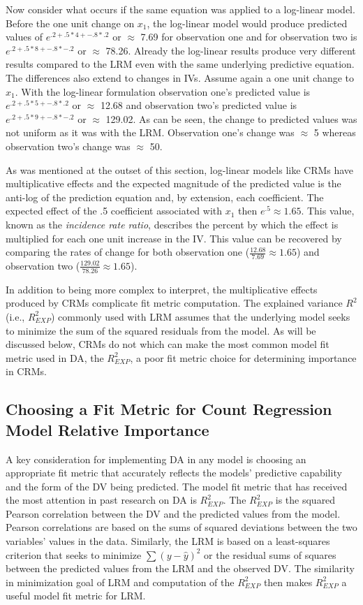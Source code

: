 \documentclass[ShortAfour,times,sageapa]{sagej}
\begin{document}
	Now consider what occurs if the same equation was applied to a log-linear model.  
	Before the one unit change on $x_1$, the log-linear model would produce predicted values of $e^{.2 + .5*4 + -.8*.2}$ or $\approx$ 7.69 for observation one and for observation two is $e^{.2 + .5*8 + -.8*-.2}$ or $\approx$ 78.26.  
	Already the log-linear results produce very different results compared to the LRM even with the same underlying predictive equation.  
	The differences also extend to changes in IVs.  
	Assume again a one unit change to $x_1$.  With the log-linear formulation observation one's predicted value is $e^{.2 + .5*5 + -.8*.2}$ or $\approx$ 12.68 and observation two's predicted value is $e^{.2 + .5*9 + -.8*-.2}$ or $\approx$ 129.02. As can be seen, the change to predicted values was not uniform as it was with the LRM. 
	Observation one's change was $\approx$ 5 whereas observation two's change was $\approx$ 50.
	
	As was mentioned at the outset of this section, log-linear models like CRMs have multiplicative effects and the expected magnitude of the predicted value is the anti-log of the prediction equation and, by extension, each coefficient.
	The expected effect of the .5 coefficient associated with $x_1$ then $e^{.5} \approx 1.65$.  
	This value, known as the \textit{incidence rate ratio}, describes the percent by which the effect is multiplied for each one unit increase in the IV.  
	This value can be recovered by comparing the rates of change for both observation one ($\frac{12.68}{7.69} \approx 1.65$) and observation two ($\frac{129.02}{78.26} \approx 1.65$).
	
	In addition to being more complex to interpret, the multiplicative effects produced by CRMs complicate fit metric computation.
	The explained variance $R^2$ (i.e., $R^2_{EXP}$) commonly used with LRM assumes that the underlying model seeks to minimize the sum of the squared residuals from the model.  
	As will be discussed below, CRMs do not which can make the most common model fit metric used in DA, the $R^2_{EXP}$, a poor fit metric choice for determining importance in CRMs.
	
	\subsection{Choosing a Fit Metric for Count Regression Model Relative Importance}
	
	A key consideration for implementing DA in any model is choosing an appropriate fit metric that accurately reflects the models' predictive capability and the form of the DV being predicted.
	The model fit metric that has received the most attention in past research on DA is $R^2_{EXP}$.
	The $R^2_{EXP}$ is the squared Pearson correlation between the DV and the predicted values from the model. 
	Pearson correlations are based on the sums of squared deviations between the two variables' values in the data.  
	Similarly, the LRM is based on a least-squares criterion that seeks to minimize $\sum (y - \hat{y})^2$ or the residual sums of squares between the predicted values from the LRM and the observed DV.
	The similarity in minimization goal of LRM and computation of the $R^2_{EXP}$ then makes $R^2_{EXP}$ a useful model fit metric for LRM.
	
\end{document}
